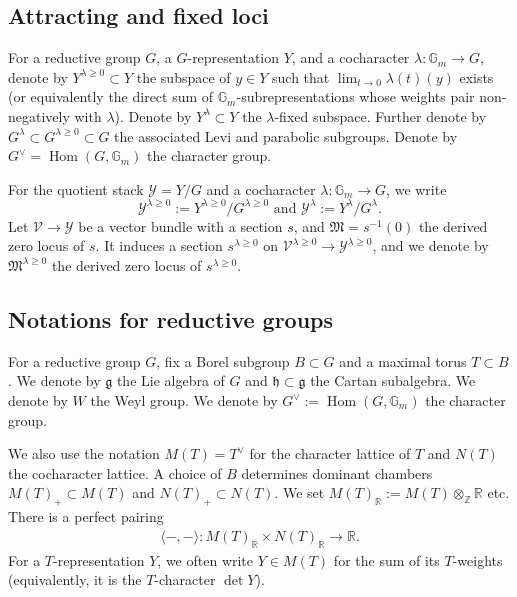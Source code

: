\documentclass [11pt,oneside,a4paper,mathscr]{amsart}
\theoremstyle{definition}
\renewcommand{\geq}{\geqslant}
\newcommand{\Y}{\mathcal{Y}}
\newcommand{\fg}{\mathfrak{g}}
\newcommand{\Hom}{\operatorname{Hom}}
\begin{document}
\subsection{Attracting and fixed loci}\label{notation:attracting}
For a reductive group $G$, a $G$-representation $Y$, and a cocharacter $\lambda \colon \mathbb{G}_m \to G$, denote by $Y^{\lambda \geq 0} \subset Y$ the subspace 
of $y\in Y$ such that $\lim_{t\to 0} \lambda(t)(y)$ exists (or equivalently the 
direct sum of $\mathbb{G}_m$-subrepresentations whose weights pair non-negatively with 
$\lambda$). Denote by $Y^{\lambda} \subset Y$ the $\lambda$-fixed subspace. 
Further denote by $G^{\lambda}\subset G^{\lambda\geq 0} \subset G$ the 
associated Levi and parabolic subgroups. 
Denote by $G^{\vee}=\Hom(G, \mathbb{G}_m)$ the character group. 

For the quotient stack $\Y=Y/G$ and a cocharacter $\lambda \colon \mathbb{G}_m \to G$, we write \[\Y^{\lambda \geq 0}:=Y^{\lambda \geq 0}/G^{\lambda \geq 0}\text{ and }\mathcal{Y}^{\lambda}:=Y^{\lambda}/G^{\lambda}.\] 
Let $\mathcal{V} \to \mathcal{Y}$ be a vector bundle with a section $s$, 
and $\mathfrak{M}=s^{-1}(0)$ the derived zero locus of $s$. 
It induces a section $s^{\lambda \geq 0}$ on $\mathcal{V}^{\lambda \geq 0} \to \Y^{\lambda \geq 0}$, and we denote by $\mathfrak{M}^{\lambda \geq 0}$ the derived zero locus of 
$s^{\lambda \geq 0}$. 


\subsection{Notations for reductive groups}\label{subsec:notation:reductive}
For a reductive group $G$, fix a Borel subgroup $B\subset G$
and a maximal torus $T\subset B$.  
We denote by $\fg$ the Lie algebra of $G$ and $\mathfrak{h} \subset \fg$ the Cartan 
subalgebra. We denote by $W$ the Weyl group. 
We denote by $G^{\vee}:=\Hom(G, \mathbb{G}_m)$ the character group. 

We also use the notation $M(T)=T^{\vee}$ for the character 
lattice of $T$ and $N(T)$ the cocharacter lattice. 
A choice of $B$ determines dominant chambers 
$M(T)_{+}\subset M(T)$ and $N(T)_{+}\subset N(T)$.
We set $M(T)_{\mathbb{R}}:=M(T)\otimes_{\mathbb{Z}}\mathbb{R}$ etc. 
There is a perfect pairing 
\begin{align*}
    \langle -, - \rangle \colon M(T)_{\mathbb{R}}\times N(T)_{\mathbb{R}} \to \mathbb{R}. 
\end{align*}
For a $T$-representation $Y$, we often write $Y \in M(T)$ for the sum of its 
$T$-weights (equivalently, it is the $T$-character $\det Y$).
\end{document}
